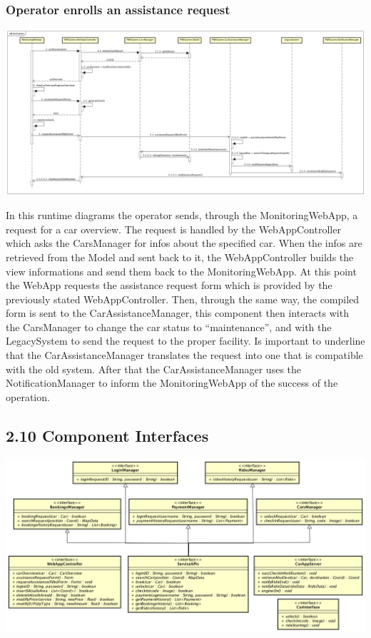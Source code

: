 \documentclass[]{article}
\begin{document}
\subsubsection{Operator enrolls an assistance
request}\label{operator-enrolls-an-assistance-request}

\centerline{\includegraphics{./runtime_diagrams/assistance_runtime.png}}

In this runtime diagrams the operator sends, through the
MonitoringWebApp, a request for a car overview. The request is handled
by the WebAppController which asks the CarsManager for infos about the
specified car. When the infos are retrieved from the Model and sent back
to it, the WebAppController builds the view informations and send them
back to the MonitoringWebApp. At this point the WebApp requests the
assistance request form which is provided by the previously stated
WebAppController. Then, through the same way, the compiled form is sent
to the CarAssistanceManager, this component then interacts with the
CarsManager to change the car status to ``maintenance'', and with the
LegacySystem to send the request to the proper facility. Is important to
underline that the CarAssistanceManager translates the request into one
that is compatible with the old system. After that the
CarAssistanceManager uses the NotificationManager to inform the
MonitoringWebApp of the success of the operation.

\subsection{2.10 Component Interfaces}\label{component-interfaces}

\centerline{\includegraphics{./runtime_diagrams/components_interfaces.png}}
\end{document}
